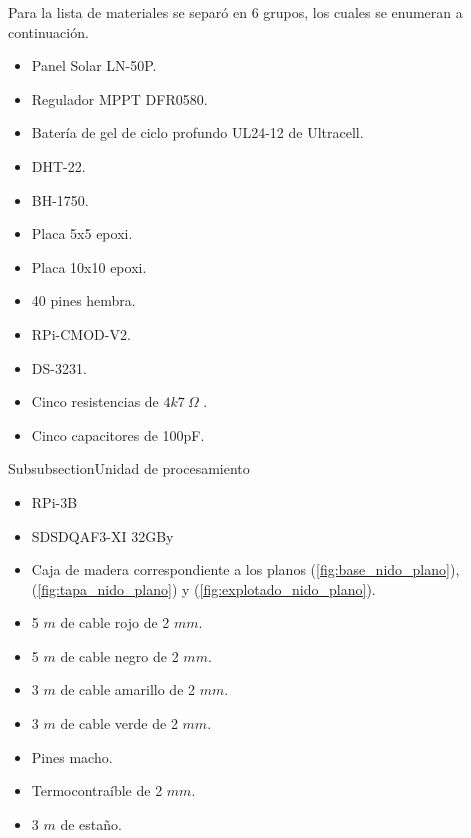 Para la lista de materiales se separó en 6 grupos, los cuales se enumeran a continuación.

\begin{itemize}
	\item Panel Solar LN-50P.
	\item Regulador MPPT DFR0580.
	\item Batería de gel de ciclo profundo UL24-12 de Ultracell.
\end{itemize}

\begin{itemize}
	\item DHT-22.
	\item BH-1750.
	\item Placa 5x5 epoxi.
	\item Placa 10x10 epoxi.
	\item 40 pines hembra.
	\item RPi-CMOD-V2.
	\item DS-3231.
	\item Cinco resistencias de $4k7 \ \Omega$ .
	\item Cinco capacitores de 100pF.
\end{itemize}

Subsubsection{Unidad de procesamiento}
\begin{itemize}
	\item RPi-3B
	\item SDSDQAF3-XI 32GBy
\end{itemize}

\begin{itemize}
	\item Caja de madera correspondiente a los planos (\ref{fig:base_nido_plano}), (\ref{fig:tapa_nido_plano}) y (\ref{fig:explotado_nido_plano}).
\end{itemize}

\begin{itemize}
	\item 5 $m$ de cable rojo de 2 $mm$.
	\item 5 $m$ de cable negro de 2 $mm$.
	\item 3 $m$ de cable amarillo de 2 $mm$.
	\item 3 $m$ de cable verde de 2 $mm$.
	\item Pines macho.
	\item Termocontraíble de 2 $mm$.
	\item 3 $m$ de estaño.
\end{itemize}









